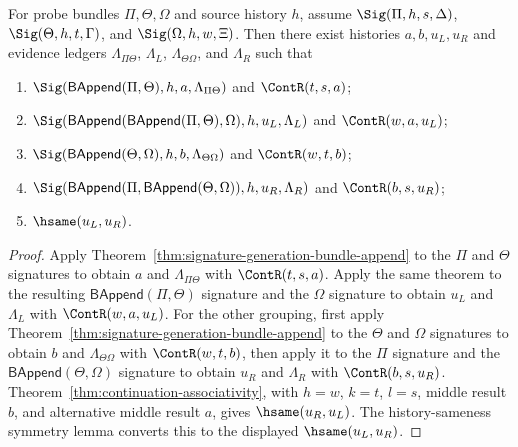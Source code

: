 \begin{theorem}
\label{thm:signature-generation-three-bundle-coherence}
For probe bundles $\Pi,\Theta,\Omega$ and source history $h$, assume
$\Sig(\Pi,h,s,\Delta)$, $\Sig(\Theta,h,t,\Gamma)$, and
$\Sig(\Omega,h,w,\Xi)$. Then there exist histories $a,b,u_L,u_R$ and evidence
ledgers $\Lambda_{\Pi\Theta}$, $\Lambda_L$, $\Lambda_{\Theta\Omega}$, and
$\Lambda_R$ such that
\begin{enumerate}
  \item $\Sig(\mathsf{BAppend}(\Pi,\Theta),h,a,\Lambda_{\Pi\Theta})$ and $\ContR(t,s,a)$;
  \item $\Sig(\mathsf{BAppend}(\mathsf{BAppend}(\Pi,\Theta),\Omega),h,u_L,\Lambda_L)$ and $\ContR(w,a,u_L)$;
  \item $\Sig(\mathsf{BAppend}(\Theta,\Omega),h,b,\Lambda_{\Theta\Omega})$ and $\ContR(w,t,b)$;
  \item $\Sig(\mathsf{BAppend}(\Pi,\mathsf{BAppend}(\Theta,\Omega)),h,u_R,\Lambda_R)$ and $\ContR(b,s,u_R)$;
  \item $\hsame(u_L,u_R)$.
\end{enumerate}
\end{theorem}
\begin{proof}
Apply Theorem~\ref{thm:signature-generation-bundle-append} to the $\Pi$ and
$\Theta$ signatures to obtain $a$ and $\Lambda_{\Pi\Theta}$ with
$\ContR(t,s,a)$. Apply the same theorem to the resulting
$\mathsf{BAppend}(\Pi,\Theta)$ signature and the $\Omega$ signature to obtain
$u_L$ and $\Lambda_L$ with $\ContR(w,a,u_L)$. For the other grouping, first
apply Theorem~\ref{thm:signature-generation-bundle-append} to the $\Theta$ and
$\Omega$ signatures to obtain $b$ and $\Lambda_{\Theta\Omega}$ with
$\ContR(w,t,b)$, then apply it to the $\Pi$ signature and the
$\mathsf{BAppend}(\Theta,\Omega)$ signature to obtain $u_R$ and $\Lambda_R$ with
$\ContR(b,s,u_R)$. Theorem~\ref{thm:continuation-associativity}, with
$h=w$, $k=t$, $l=s$, middle result $b$, and alternative middle result $a$,
gives $\hsame(u_R,u_L)$. The history-sameness symmetry lemma converts this to
the displayed $\hsame(u_L,u_R)$.
\end{proof}


